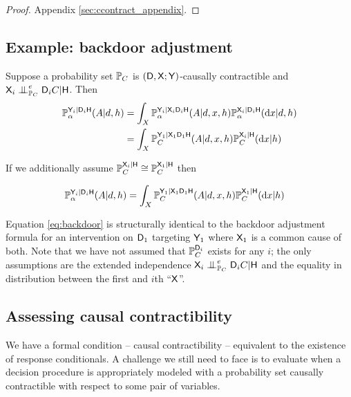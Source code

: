 \begin{proof}
Appendix \ref{sec:ccontract_appendix}.
\end{proof}


\subsection{Example: backdoor adjustment}

Suppose a probability set $\mathbb{P}_C$ is $(\mathsf{D},\mathsf{X};\mathsf{Y})$-causally contractible and $\RV{X}_{i}\CI^e_{\prob{P}_C}\RV{D}_{i}C|\RV{H}$. Then
\begin{align}
    \mathbb{P}_\alpha^{\mathsf{Y}_{i}|\mathsf{D}_{i}\mathsf{H}}(A|d,h) &= \int_X \mathbb{P}_\alpha^{\mathsf{Y}_{i}|\mathsf{X}_{i}\mathsf{D}_{i}\mathsf{H}}(A|d,x,h)\mathbb{P}_\alpha^{\mathsf{X}_{i}|\mathsf{D}_{i}\mathsf{H}}(\mathrm{d}x|d,h)\\
    &= \int_X \mathbb{P}_C^{\mathsf{Y}_{1}|\mathsf{X}_{1}\mathsf{D}_{1}\mathsf{H}}(A|d,x,h)\mathbb{P}_C^{\mathsf{X}_{i}|\mathsf{H}}(\mathrm{d}x|h)
\end{align}

If we additionally assume $\mathbb{P}_C^{\mathsf{X}_{i}|\mathsf{H}}\cong \mathbb{P}_C^{\mathsf{X}_{1}|\mathsf{H}}$ then 

\begin{align}
    \mathbb{P}_\alpha^{\mathsf{Y}_{i}|\mathsf{D}_{i}\mathsf{H}}(A|d,h) &= \int_X \mathbb{P}_C^{\mathsf{Y}_{1}|\mathsf{X}_{1}\mathsf{D}_{1}\mathsf{H}}(A|d,x,h)\mathbb{P}_C^{\mathsf{X}_{1}|\mathsf{H}}(\mathrm{d}x|h)\label{eq:backdoor}
\end{align}

Equation \ref{eq:backdoor} is structurally identical to the backdoor adjustment formula for an intervention on $\mathsf{D}_1$ targeting $\mathsf{Y}_1$ where $\mathsf{X}_1$ is a common cause of both. Note that we have not assumed that $\mathbb{P}_C^{\mathsf{D}_i}$ exists for any $i$; the only assumptions are the extended independence $\RV{X}_{i}\CI^e_{\prob{P}_C}\RV{D}_{i}C|\RV{H}$ and the equality in distribution between the first and $i$th ``$\mathsf{X}$''.

\subsection{Assessing causal contractibility}

We have a formal condition -- causal contractibility -- equivalent to the existence of response conditionals. A challenge we still need to face is to evaluate when a decision procedure is appropriately modeled with a probability set causally contractible with respect to some pair of variables.

